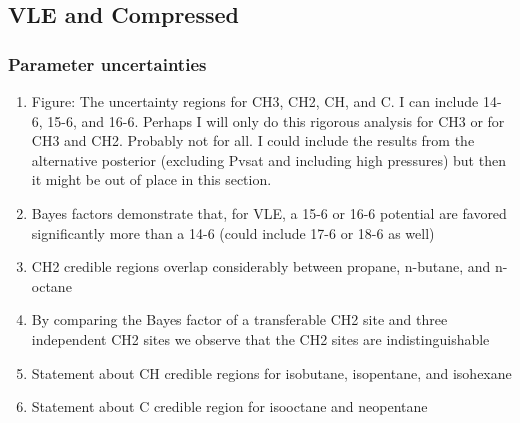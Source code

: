 \documentclass[preprint,letterpaper,floatfix,citeautoscript,aip,jcp]{revtex4-1}
\begin{document}
\subsection{VLE and Compressed}

\subsubsection{Parameter uncertainties}

\begin{enumerate}
	\item Figure: The uncertainty regions for CH3, CH2, CH, and C. I can include 14-6, 15-6, and 16-6. Perhaps I will only do this rigorous analysis for CH3 or for CH3 and CH2. Probably not for all. 
I could include the results from the alternative posterior (excluding Pvsat and including high pressures) but then it might be out of place in this section.
	\item Bayes factors demonstrate that, for VLE, a 15-6 or 16-6 potential are favored significantly more than a 14-6 (could include 17-6 or 18-6 as well)
	\item CH2 credible regions overlap considerably between propane, n-butane, and n-octane
	\item By comparing the Bayes factor of a transferable CH2 site and three independent CH2 sites we observe that the CH2 sites are indistinguishable
	\item Statement about CH credible regions for isobutane, isopentane, and isohexane
	\item Statement about C credible region for isooctane and neopentane
\end{enumerate}
\end{document}
